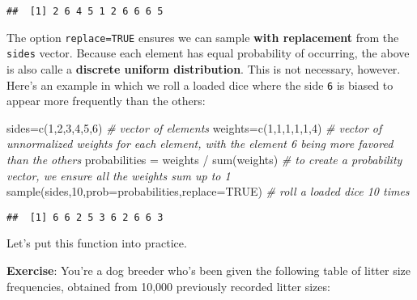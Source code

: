 \documentclass[
]{book}
\newenvironment{Shaded}{\begin{snugshade}}{\end{snugshade}}
\newcommand{\AttributeTok}[1]{\textcolor[rgb]{0.77,0.63,0.00}{#1}}
\newcommand{\CommentTok}[1]{\textcolor[rgb]{0.56,0.35,0.01}{\textit{#1}}}
\newcommand{\ConstantTok}[1]{\textcolor[rgb]{0.00,0.00,0.00}{#1}}
\newcommand{\DecValTok}[1]{\textcolor[rgb]{0.00,0.00,0.81}{#1}}
\newcommand{\FunctionTok}[1]{\textcolor[rgb]{0.00,0.00,0.00}{#1}}
\newcommand{\NormalTok}[1]{#1}
\newcommand{\OtherTok}[1]{\textcolor[rgb]{0.56,0.35,0.01}{#1}}
\newcommand{\SpecialCharTok}[1]{\textcolor[rgb]{0.00,0.00,0.00}{#1}}
\begin{document}
\begin{verbatim}
##  [1] 2 6 4 5 1 2 6 6 6 5
\end{verbatim}

The option \texttt{replace=TRUE} ensures we can sample \textbf{with replacement} from the \texttt{sides} vector. Because each element has equal probability of occurring, the above is also calle a \textbf{discrete uniform distribution}. This is not necessary, however. Here's an example in which we roll a loaded dice where the side \texttt{6} is biased to appear more frequently than the others:

\begin{Shaded}
\begin{Highlighting}[]
\NormalTok{sides}\OtherTok{=}\FunctionTok{c}\NormalTok{(}\DecValTok{1}\NormalTok{,}\DecValTok{2}\NormalTok{,}\DecValTok{3}\NormalTok{,}\DecValTok{4}\NormalTok{,}\DecValTok{5}\NormalTok{,}\DecValTok{6}\NormalTok{) }\CommentTok{\# vector of elements}
\NormalTok{weights}\OtherTok{=}\FunctionTok{c}\NormalTok{(}\DecValTok{1}\NormalTok{,}\DecValTok{1}\NormalTok{,}\DecValTok{1}\NormalTok{,}\DecValTok{1}\NormalTok{,}\DecValTok{1}\NormalTok{,}\DecValTok{4}\NormalTok{) }\CommentTok{\# vector of unnormalized weights for each element, with the element \textquotesingle{}6\textquotesingle{} being more favored than the others}
\NormalTok{probabilities }\OtherTok{=}\NormalTok{ weights }\SpecialCharTok{/} \FunctionTok{sum}\NormalTok{(weights) }\CommentTok{\# to create a probability vector, we ensure all the weights sum up to 1}
\FunctionTok{sample}\NormalTok{(sides,}\DecValTok{10}\NormalTok{,}\AttributeTok{prob=}\NormalTok{probabilities,}\AttributeTok{replace=}\ConstantTok{TRUE}\NormalTok{) }\CommentTok{\# roll a loaded dice 10 times}
\end{Highlighting}
\end{Shaded}

\begin{verbatim}
##  [1] 6 6 2 5 3 6 2 6 6 3
\end{verbatim}

Let's put this function into practice.

\textbf{Exercise}: You're a dog breeder who's been given the following table of litter size frequencies, obtained from 10,000 previously recorded litter sizes:
\end{document}
